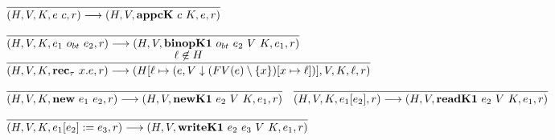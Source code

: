 \documentclass[fleqn]{article}
\begin{document}
\[\begin{array}{l}
	\infer{(H,V,K,e~c,r) \longrightarrow (H,V,\mathbf{appcK}~c~K,e,r)}{\vspace{1em}} \\
	\infer{(H,V,K,e_1~o_{bt}~e_2,r) \longrightarrow (H,V,\mathbf{binopK1}~o_{bt}~e_2~V~K,e_1,r)}{\vspace{1em}} \\
	\infer{(H,V,K,\mathbf{rec}_\tau~x.e,r) \longrightarrow (H[\ell \mapsto (e,V \downarrow (FV(e) \setminus \{x\})[x \mapsto \ell])], V, K,\ell ,r)}{\ell \not\in H} \\
	\infer{(H,V,K,\mathbf{new}~e_1~e_2,r) \longrightarrow (H,V,\mathbf{newK1}~e_2~V~K,e_1,r)}{\vspace{1em}} \hspace{1em}
	\infer{(H,V,K,e_1[e_2],r) \longrightarrow (H,V,\mathbf{readK1}~e_2~V~K,e_1,r)}{\vspace{1em}} \\
	\infer{(H,V,K,e_1[e_2]:=e_3,r) \longrightarrow (H,V,\mathbf{writeK1}~e_2~e_3~V~K,e_1,r)}{\vspace{1em}} \\
\end{array}
\]
\end{document}
